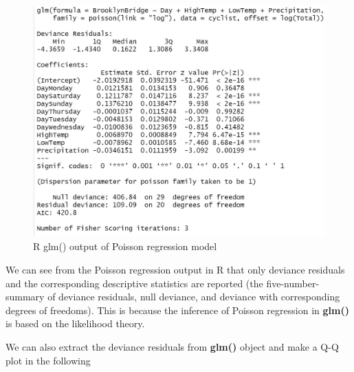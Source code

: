 \documentclass[
]{book}
\newenvironment{Shaded}{\begin{snugshade}}{\end{snugshade}}
\newcommand{\AttributeTok}[1]{\textcolor[rgb]{0.13,0.29,0.53}{#1}}
\newcommand{\DecValTok}[1]{\textcolor[rgb]{0.00,0.00,0.81}{#1}}
\newcommand{\FunctionTok}[1]{\textcolor[rgb]{0.13,0.29,0.53}{\textbf{#1}}}
\newcommand{\NormalTok}[1]{#1}
\newcommand{\OtherTok}[1]{\textcolor[rgb]{0.56,0.35,0.01}{#1}}
\newcommand{\SpecialCharTok}[1]{\textcolor[rgb]{0.81,0.36,0.00}{\textbf{#1}}}
\newcommand{\StringTok}[1]{\textcolor[rgb]{0.31,0.60,0.02}{#1}}
\begin{document}
\begin{figure}

{\centering \includegraphics[width=0.7\linewidth]{img10/w10-glmPoisOutput} 

}

\caption{R glm() output of Poisson regression model}\label{fig:unnamed-chunk-164}
\end{figure}

We can see from the Poisson regression output in R that only deviance residuals and the corresponding descriptive statistics are reported (the five-number-summary of deviance residuals, null deviance, and deviance with corresponding degrees of freedoms). This is because the inference of Poisson regression in \textbf{glm()} is based on the likelihood theory.

We can also extract the deviance residuals from \textbf{glm()} object and make a Q-Q plot in the following

\begin{Shaded}
\end{Shaded}
\end{document}
